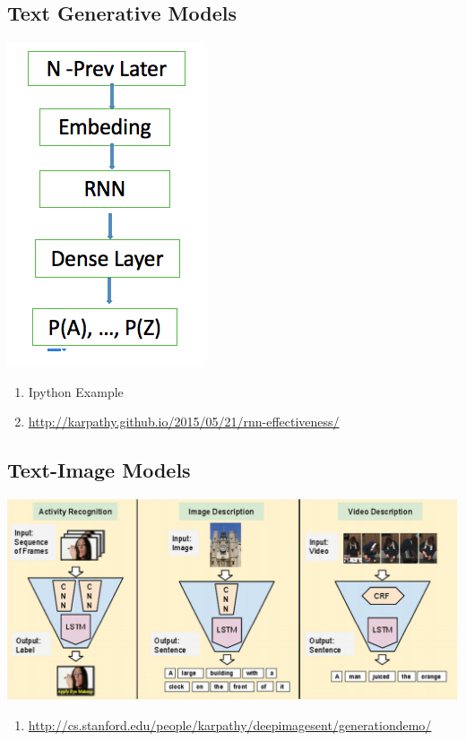 \documentclass{beamer}
\begin{document}
	\subsection{Text Generative Models}
	\begin{frame}
		\begin{center}
			\includegraphics[scale=0.5]{img/gen}
		\end{center}
		\begin{enumerate}
			\item Ipython Example
			\item \href{http://karpathy.github.io/2015/05/21/rnn-effectiveness/}{http://karpathy.github.io/2015/05/21/rnn-effectiveness/}
		\end{enumerate}

	\end{frame}
	
	\subsection{Text-Image Models}
	\begin{frame}
		\begin{center}
			\includegraphics[scale=0.3]{img/im2txt}
		\end{center}
		{\small 
		\begin{enumerate}
			\item \href{http://cs.stanford.edu/people/karpathy/deepimagesent/generationdemo/}
			{http://cs.stanford.edu/people/karpathy/deepimagesent/generationdemo/}
		\end{enumerate}
	}
	\end{frame}
\end{document}
